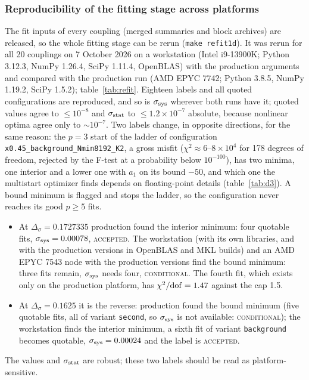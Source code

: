 \documentclass[10pt,a4paper]{article}
\newcommand{\Ds}{\Delta_\sigma}
\newcommand{\code}[1]{\texttt{#1}}
\newcommand{\lbl}[1]{{\mdseries\scshape #1}}
\newcommand{\sstat}{\sigma_{\rm stat}}
\newcommand{\ssys}{\sigma_{\rm sys}}
\begin{document}
\subsubsection{Reproducibility of the fitting stage across platforms}\label{sec:1drefit}
The fit inputs of every coupling (merged summaries and block archives) are released, so the whole fitting stage can be rerun
(\code{make refit1d}). It was rerun for all 20 couplings on 7 October 2026 on a workstation (Intel i9-13900K; Python 3.12.3, NumPy 1.26.4,
SciPy 1.11.4, OpenBLAS) with the production arguments and compared with the production run (AMD EPYC 7742; Python 3.8.5, NumPy 1.19.2, SciPy
1.5.2); table~\ref{tab:refit}. Eighteen labels and all quoted configurations are reproduced, and so is $\ssys$ wherever both runs have it;
quoted values agree to $\le10^{-8}$ and $\sstat$ to $\le1.2\times10^{-7}$ absolute, because nonlinear optima agree only to $\sim10^{-7}$. Two
labels change, in opposite directions, for the same reason: the $p=3$ start of the ladder of configuration \code{x0.45\_background\_Nmin8192\_K2},
a gross misfit ($\chi^2\approx6$--$8\times10^4$ for 178 degrees of freedom, rejected by the F-test at a probability below $10^{-100}$), has two minima, one
interior and a lower one with $a_1$ on its bound $-50$, and which one the multistart optimizer finds depends on floating-point details
(table~\ref{tab:d3}). A bound minimum is flagged and stops the ladder, so the configuration never reaches its good $p\ge5$ fits.
\begin{itemize}
\item At $\Ds=0.1727335$ production found the interior minimum: four quotable fits, $\ssys=0.00078$, \lbl{accepted}. The workstation (with its
 own libraries, and with the production versions in OpenBLAS and MKL builds) and an AMD EPYC 7543 node with the production versions find the
 bound minimum: three fits remain, $\ssys$ needs four, \lbl{conditional}. The fourth fit, which exists only on the production platform, has
 $\chi^2/{\rm dof}=1.47$ against the cap 1.5.
\item At $\Ds=0.1625$ it is the reverse: production found the bound minimum (five quotable fits, all of variant \code{second}, so $\ssys$ is not
 available: \lbl{conditional}); the workstation finds the interior minimum, a sixth fit of variant \code{background} becomes quotable, $\ssys=0.00024$
 and the label is \lbl{accepted}.
\end{itemize}
The values and $\sstat$ are robust; these two labels should be read as platform-sensitive.
\end{document}
